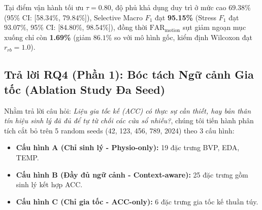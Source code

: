 \documentclass[conference]{IEEEtran}
\begin{document}
Tại điểm vận hành tối ưu $\tau = 0.80$, độ phủ khả dụng duy trì ở mức cao $69.38\%$ (95\% CI: [58.34\%, 79.84\%]), Selective Macro $F_1$ đạt \textbf{95.15\%} (Stress $F_1$ đạt $93.07\%$, 95\% CI: [84.80\%, 98.54\%]), đồng thời $\text{FAR}_{\text{motion}}$ sụt giảm ngoạn mục xuống chỉ còn \textbf{1.69\%} (giảm $86.1\%$ so với mô hình gốc, kiểm định Wilcoxon đạt $r_{rb} = 1.0$).

\subsection{Trả lời RQ4 (Phần 1): Bóc tách Ngữ cảnh Gia tốc (Ablation Study Đa Seed)}
Nhằm trả lời câu hỏi: \textit{Liệu gia tốc kế (ACC) có thực sự cần thiết, hay bản thân tín hiệu sinh lý đã đủ để tự từ chối các cửa sổ nhiễu?}, chúng tôi tiến hành phân tích cắt bỏ trên 5 random seeds (42, 123, 456, 789, 2024) theo 3 cấu hình:
\begin{itemize}
    \item \textbf{Cấu hình A (Chỉ sinh lý - Physio-only):} 19 đặc trưng BVP, EDA, TEMP.
    \item \textbf{Cấu hình B (Đầy đủ ngữ cảnh - Context-aware):} 25 đặc trưng gồm sinh lý kết hợp ACC.
    \item \textbf{Cấu hình C (Chỉ gia tốc - ACC-only):} 6 đặc trưng gia tốc kế thuần túy.
\end{itemize}

\begin{table}[htbp]
\caption{Nghiên cứu cắt bỏ đa hạt giống (5 seeds) tại ngưỡng $\tau = 0.80$ trên dữ liệu LOSO WESAD.}
\label{tab:ablation_seeds}
\centering
{}
\end{table}
\end{document}
